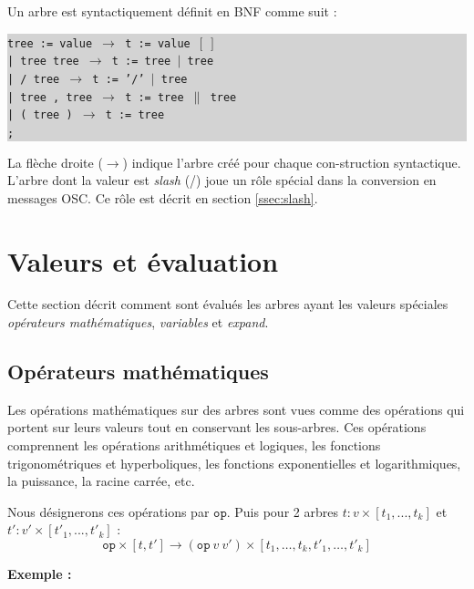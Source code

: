 \documentclass{article}
\newcommand{\exemple}	{\vspace*{2mm}\hspace*{-4mm}\textbf{Exemple :}}
\newcommand{\code}	[2][0.9]	{\vspace{0mm}\begin{center}\colorbox{lightgrey}{
							\begin{minipage}[t]{#1\columnwidth} 
							{\small \texttt{#2}}
							\end{minipage}}\end{center}}
\newcommand{\llist}	[1]		{\ensuremath{[#1_1,...,#1_k]}}
\newcommand{\seq}		{\ensuremath{|}}
\newcommand{\paral}		{\ensuremath{\parallel}}
\newcommand{\binop}		{\ensuremath{\texttt{op}}}
\newcommand{\etc}		{\ensuremath{\text{…}}}
\newcommand{\emptyf}	{\ensuremath{[\ ]}}
\newcommand{\ula}		{\hspace*{8mm}}
\begin{document}
Un arbre est syntactiquement définit en BNF comme suit :
\code{tree := value      \hspace*{8mm} $\to$ t := value \emptyf \\
\ula | tree tree         \hspace*{4mm} $\to$ t := tree \seq\ tree \\
\ula | / tree            \hspace*{9.7mm} $\to$ t := '/' \seq\ tree\\
\ula | tree , tree       \hspace*{0mm}  $\to$ t := tree \paral\ tree \\
\ula | ( tree )          \hspace*{6mm} $\to$ t := tree \\
\ula ;
}
La flèche droite ($\to$) indique l'arbre créé pour chaque con-struction syntactique. 
L'arbre dont la valeur est \emph{slash} (/) joue un rôle spécial dans la conversion en messages OSC. Ce rôle est décrit en section \ref{ssec:slash}.


\section{Valeurs et évaluation}\label{sec:valeurs}

Cette section décrit comment sont évalués les arbres ayant les valeurs spéciales \emph{opérateurs mathématiques}, \emph{variables} et \emph{expand}.

\subsection{Opérateurs mathématiques}

Les opérations mathématiques sur des arbres sont vues comme des opérations qui portent sur leurs valeurs tout en conservant les sous-arbres. Ces opérations comprennent les opérations arithmétiques et logiques, les fonctions trigonométriques et hyperboliques, les fonctions exponentielles et logarithmiques, la puissance, la racine carrée, etc.

Nous désignerons ces opérations par \binop. Puis pour 2 arbres $t : v \times \llist{t}$ et $t' : v' \times \llist{t'}$ :
\[
	\binop \times [ t, t']  \to  (\binop\ v\ v') \times [ t_1,\etc,t_k,t'_1,\etc,t'_k ]
\]


\exemple
\end{document}
